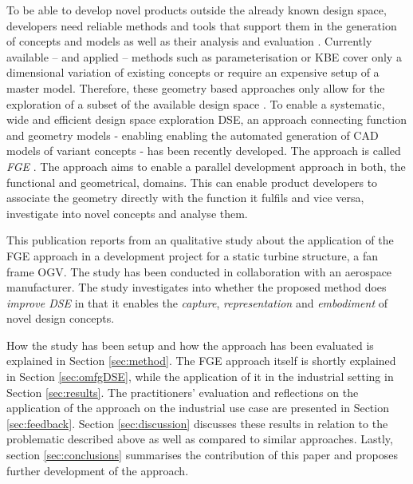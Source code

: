 \documentclass[preprints,article,accept,moreauthors,pdftex]{Definitions/mdpi}
\begin{document}
To be able to develop novel products outside the already known design space, developers need reliable methods and tools that support them in the generation of concepts and models as well as their analysis and evaluation \cite{Woodbury2006, Kang2011, Isaksson2016}.
Currently available -- and applied -- methods such as parameterisation \citep{VanDerLaan2005ParametricAnalysis} or \ac{KBE} \cite{Sandberg2011} cover only a dimensional variation of existing concepts or require an expensive setup of a master model.
Therefore, these geometry based approaches only allow for the exploration of a subset of the available design space \citep{Woodbury2006, Muller2019ICED}.
To enable a systematic, wide and efficient design space exploration \ac{DSE}, an approach connecting function and geometry models - enabling enabling the automated
generation of CAD models of variant concepts - has been recently developed.
The approach is called \textit{\acf{FGE}}  \cite{Muller2021FunctionVariants}.
The approach aims to enable a parallel development approach in both, the functional and geometrical, domains.
This can enable product developers to associate the geometry directly with the function it fulfils and vice versa, investigate into novel concepts and analyse them.

This publication reports from an qualitative study about the application of the \ac{FGE} approach in a development project for a static turbine structure, a fan frame \ac{OGV}. 
The study has been conducted in collaboration with an aerospace manufacturer. 
The study investigates into whether the proposed method does \textit{improve \ac{DSE}} in that it enables the \textit{capture}, \textit{representation} and \textit{embodiment} of novel design concepts.

How the study has been setup and how the approach has been evaluated is explained in Section \ref{sec:method}.
The \ac{FGE} approach itself is shortly explained in Section \ref{sec:omfgDSE}, while the application of it in the industrial setting in Section \ref{sec:results}. 
The practitioners' evaluation and reflections on the application of the approach on the industrial use case  are presented in Section \ref{sec:feedback}.
Section \ref{sec:discussion} discusses these results in relation to the problematic described above as well as compared to similar approaches.
Lastly, section \ref{sec:conclusions} summarises the contribution of this paper and proposes further development of the approach.
\end{document}
